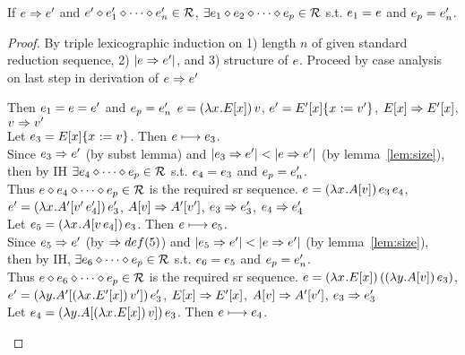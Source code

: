 \documentclass{article}
\begin{document}
\begin{lemma}
\label{lem:pstepsr}
If $\e \pstep \e'$ and $\e' \srseqop \srseqe[']{n}$, $\exists \srseqconse[_1]
\srseq{\e_2}{\e_p}$ s.t. $\e_1 = \e$ and $\e_p = \e_n'$.
\end{lemma}

\begin{proof}
By triple lexicographic induction on 1) length $n$ of given standard reduction
sequence, 2) $\size{\e \pstep \e'}$, and 3) structure of $\e$. Proceed by case
analysis on last step in derivation of $\e \pstep \e'$
\begin{byCases}
   Then $\e_1 = \e = \e'$ and $\e_p = \e_n'$
  $\e = \app{\lxEx}{\val}$, $\e' = \substx{\Ex[']}{\val'}$, 
  $\Ex \pstep \Ex[']$, $\val \pstep \val'$ \\
  Let $\e_3 = \substx{\Ex}{\val}$. Then $\e \srstep \e_3$. \\
  Since $\e_3 \pstep \e'$ (by subst lemma)
  and $\size{\e_3 \pstep \e'} < \size{\e \pstep \e'}$
  (by lemma~\ref{lem:size}), \\
  then by IH $\exists \srseq{\e_4}{e_p}$  
        s.t. $\e_4 = \e_3$ and $\e_p = \e_n'$. \\
  Thus $\srseqconse \srseq{\e_4}{\e_p}$ is the required sr sequence.
  $\e = \ap{\app{\lxAv}{\e_3}}{\e_4}$, 
  $\e' = \app{\lx{\inA[']{\ap{\val'}{\e_4'}}}}{\e_3'}$,
  $\Av \pstep \inA[']{\val'}$, $\e_3 \pstep \e_3'$, $\e_4 \pstep \e_4'$ \\
  Let $e_5 = \app{\lx{\inA{\ap{\val}{\e_4}}}}{\e_3}$. Then $\e \srstep \e_5$. \\
  Since $\e_5 \pstep \e'$ (by $\pstep def(5)$)
  and $\size{\e_5 \pstep \e'} < \size{\e \pstep \e'}$
  (by lemma~\ref{lem:size}), \\
  then by IH, $\exists \srseq{\e_6}{\e_p}$ 
       s.t. $\e_6 = \e_5$ and $\e_p = \e_n'$. \\
  Thus $\srseqconse \srseq{\e_6}{\e_p}$ is the required sr sequence.
  $\e = \appp{\lxEx}{\app{\lm{y}{\Av}}{\e_3}}$, 
  $\e' = \app{\lm{y}{\inA[']{\app{\lxEx[']}{\val'}}}}{\e_3'}$,
  $\Ex \pstep \Ex[']$, $\Av \pstep \inA[']{\val'}$, $\e_3 \pstep \e_3'$ \\
  Let $e_4 = \app{\lm{y}{\inA{\app{\lxEx}{\val}}}}{\e_3}$. 
  Then $\e \srstep \e_4$. \\

\end{byCases}
\end{proof}
\end{document}
